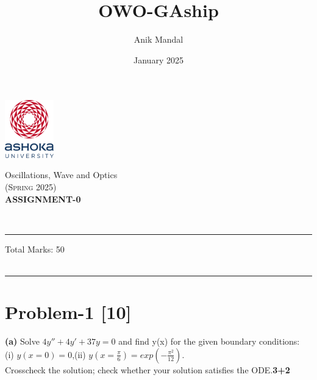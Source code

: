\documentclass[12pt, a4paper]{article}
\title{OWO-GAship}
\author{Anik Mandal}
\date{January 2025}
\begin{document}
\begin{minipage}[t][][c]{0.1\textwidth}
    \begin{flushleft}
        \includegraphics[height=2.5cm]{tex-resources/Ashoka Logo.png}
    \end{flushleft}
\end{minipage}
\begin{minipage}[t][][c]{0.85\textwidth}
    \begin{center}
        {\LARGE Oscillations, Wave and Optics}\\ \vspace{0.5em}
        \textsc{(Spring 2025)}\\
        \vspace{1em}
        \textbf{\Large ASSIGNMENT-0} \\
    \end{center}
\end{minipage}
\vspace{10pt}\\
\rule[0em]{\textwidth}{0.75pt}

\hfill 
Total Marks: 50   \\
\hfill
{}\\
\vspace{.2cm}
\rule[0em]{\textwidth}{1.75pt}
\vspace{-1cm}
\justifying

\section*{Problem-1 \hfill \textbf{[10]}}
\textbf{(a)} Solve $4y'' + 4y' + 37y=0$ and find y(x) for the given boundary conditions: \\
(i) $y(x=0)=0$,(ii) $y(x=\frac{\pi}{6})=exp(-\frac{\pi^2}{12})$.\\
Crosscheck the solution; check whether your solution satisfies the ODE.\hfill \textbf{3+2}\\
\end{document}
